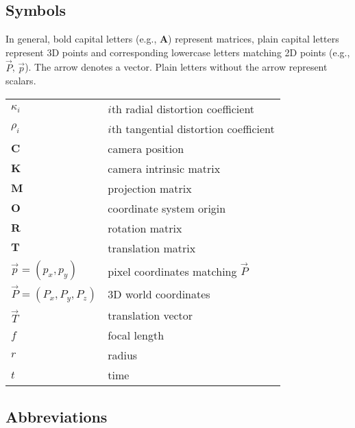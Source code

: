 
\subsection*{Symbols}

In general, bold capital letters (e.g., $\bm A$) represent matrices, plain capital letters represent 3D points and corresponding lowercase letters matching 2D points (e.g., $\vec P$, $\vec p$).
The arrow denotes a vector.
Plain letters without the arrow represent scalars.

\begin{tabular}{ll}
	$\kappa_i$ & $i$th radial distortion coefficient\\
	$\rho_i$ & $i$th tangential distortion coefficient\\
	$\bm C$ & camera position\\
	$\bm K$ & camera intrinsic matrix\\
	$\bm M$ & projection matrix\\
	$\bm O$ & coordinate system origin\\
	$\bm R$ & rotation matrix\\
	$\bm T$ & translation matrix\\
	$\vec p = (p_x, p_y)$ & pixel coordinates matching $\vec P$\\
	$\vec P = (P_x, P_y, P_z)$ & 3D world coordinates\\
	$\vec T$ & translation vector\\
	$f$ & focal length\\
	$r$ & radius\\
	$t$ & time\\
\end{tabular}
%
%

\subsection*{Abbreviations}


